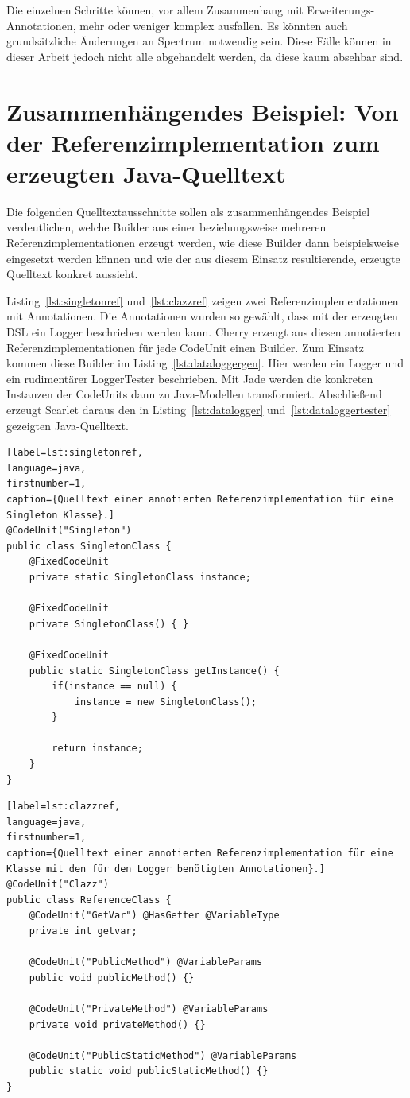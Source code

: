 \documentclass[12pt,oneside,a4paper,parskip]{scrbook}
\begin{document}
Die einzelnen Schritte können, vor allem Zusammenhang mit Erweiterungs-Annotationen, mehr oder weniger komplex ausfallen. Es könnten auch grundsätzliche Änderungen an Spectrum notwendig sein. Diese Fälle können in dieser Arbeit jedoch nicht alle abgehandelt werden, da diese kaum absehbar sind.

\section{Zusammenhängendes Beispiel: Von der Referenzimplementation zum erzeugten Java-Quelltext}

Die folgenden Quelltextausschnitte sollen als zusammenhängendes Beispiel verdeutlichen, welche Builder aus einer beziehungsweise mehreren Referenzimplementationen erzeugt werden, wie diese Builder dann beispielsweise eingesetzt werden können und wie der aus diesem Einsatz resultierende, erzeugte Quelltext konkret aussieht.

Listing~\ref{lst:singletonref} und~\ref{lst:clazzref} zeigen zwei Referenzimplementationen mit Annotationen. Die Annotationen wurden so gewählt, dass mit der erzeugten DSL ein Logger beschrieben werden kann. Cherry erzeugt aus diesen annotierten Referenzimplementationen für jede CodeUnit einen Builder. Zum Einsatz kommen diese Builder im Listing~\ref{lst:dataloggergen}. Hier werden ein Logger und ein rudimentärer LoggerTester beschrieben. Mit Jade werden die konkreten Instanzen der CodeUnits dann zu Java-Modellen transformiert. Abschließend erzeugt Scarlet daraus den in Listing~\ref{lst:datalogger} und~\ref{lst:dataloggertester} gezeigten Java-Quelltext.

\begin{lstlisting}[label=lst:singletonref,
language=java,
firstnumber=1,
caption={Quelltext einer annotierten Referenzimplementation für eine Singleton Klasse}.]
@CodeUnit("Singleton")
public class SingletonClass {
	@FixedCodeUnit
	private static SingletonClass instance;
	
	@FixedCodeUnit
	private SingletonClass() { }
	
	@FixedCodeUnit
	public static SingletonClass getInstance() {
		if(instance == null) {
			instance = new SingletonClass();
		}
		
		return instance;
	}
}
\end{lstlisting}
\newpage
\begin{lstlisting}[label=lst:clazzref,
language=java,
firstnumber=1,
caption={Quelltext einer annotierten Referenzimplementation für eine Klasse mit den für den Logger benötigten Annotationen}.]
@CodeUnit("Clazz")
public class ReferenceClass {
	@CodeUnit("GetVar") @HasGetter @VariableType
	private int getvar;
	
	@CodeUnit("PublicMethod") @VariableParams
	public void publicMethod() {}
	
	@CodeUnit("PrivateMethod") @VariableParams
	private void privateMethod() {}
	
	@CodeUnit("PublicStaticMethod") @VariableParams
	public static void publicStaticMethod() {}
}
\end{lstlisting}
\end{document}
